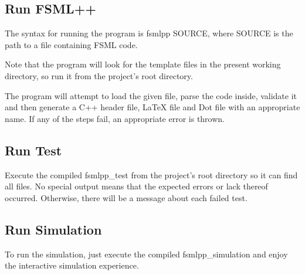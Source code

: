 \subsection*{Run F\-S\-M\-L++}

The syntax for running the program is {\ttfamily fsmlpp S\-O\-U\-R\-C\-E}, where S\-O\-U\-R\-C\-E is the path to a file containing F\-S\-M\-L code.

Note that the program will look for the template files in the present working directory, so run it from the project's root directory.

The program will attempt to load the given file, parse the code inside, validate it and then generate a C++ header file, La\-Te\-X file and Dot file with an appropriate name. If any of the steps fail, an appropriate error is thrown.

\subsection*{Run Test}

Execute the compiled {\ttfamily fsmlpp\-\_\-test} from the project's root directory so it can find all files. No special output means that the expected errors or lack thereof occurred. Otherwise, there will be a message about each failed test.

\subsection*{Run Simulation}

To run the simulation, just execute the compiled {\ttfamily fsmlpp\-\_\-simulation} and enjoy the interactive simulation experience. 